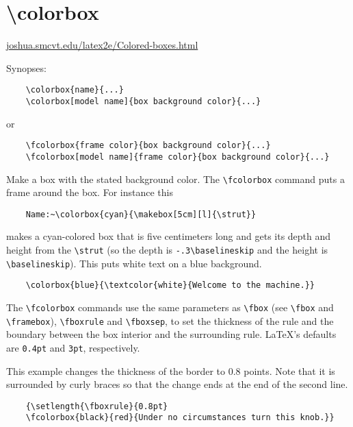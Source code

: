  
 

\section{\textbackslash colorbox}
\url{joshua.smcvt.edu/latex2e/Colored-boxes.html}

Synopses:

\begin{verbatim}
	\colorbox{name}{...}
	\colorbox[model name]{box background color}{...}
\end{verbatim}

or

\begin{verbatim}
	\fcolorbox{frame color}{box background color}{...}
	\fcolorbox[model name]{frame color}{box background color}{...}
\end{verbatim}

Make a box with the stated background color. The \verb|\fcolorbox| command puts a frame around the box. 
For instance this

\begin{verbatim}
	Name:~\colorbox{cyan}{\makebox[5cm][l]{\strut}}
\end{verbatim}

makes a cyan-colored box that is five centimeters long and gets its depth and
height from the \verb|\strut| (so the depth is \verb|-.3\baselineskip| and the height is
\verb|\baselineskip|). This puts white text on a blue background.

\begin{verbatim}
	\colorbox{blue}{\textcolor{white}{Welcome to the machine.}}
\end{verbatim}

The \verb|\fcolorbox| commands use the same parameters as \verb|\fbox| (see
\verb|\fbox| and \verb|\framebox|), \verb|\fboxrule| and \verb|\fboxsep|, to
set the thickness of the rule and the boundary between the box interior and the
surrounding rule. LaTeX’s defaults are \verb|0.4pt| and \verb|3pt|,
respectively.

This example changes the thickness of the border to 0.8 points. Note that it is
surrounded by curly braces so that the change ends at the end of the second
line.

\begin{verbatim}
	{\setlength{\fboxrule}{0.8pt}
	\fcolorbox{black}{red}{Under no circumstances turn this knob.}}
\end{verbatim}

